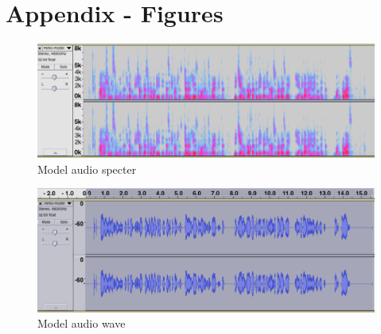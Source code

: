 \chapter{Appendix - Figures}


\begin{figure}[h]
\caption{Model audio specter}
\label{fig:specter}
\centering
\includegraphics[scale=0.23]{model-spectre.png}
\end{figure}
\begin{figure}[h]
\caption{Model audio wave}
\label{fig:wave}
\centering
\includegraphics[scale=0.23]{model-wave.png}
\end{figure}
